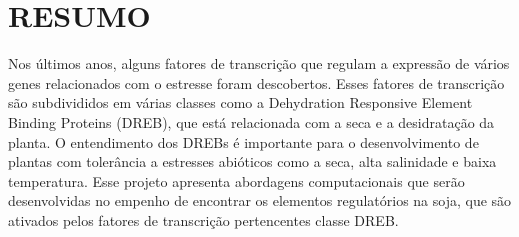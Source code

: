 \chapter{RESUMO}

Nos últimos anos, alguns fatores de transcrição que regulam a expressão de vários genes relacionados com o estresse foram descobertos. Esses fatores de transcrição são subdivididos em várias classes como a Dehydration Responsive Element Binding Proteins (DREB), que está relacionada com a seca e a desidratação da planta. O entendimento dos DREBs é importante para o desenvolvimento de plantas com tolerância a estresses abióticos como a seca, alta salinidade e baixa temperatura. Esse projeto apresenta abordagens computacionais que serão desenvolvidas no empenho de encontrar os elementos regulatórios na soja, que são ativados pelos fatores de transcrição pertencentes classe DREB.
